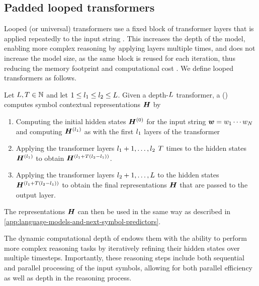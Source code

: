 \subsection{Padded looped transformers} \label{app:looped-padded-transformers}

Looped (or universal) transformers use a fixed block of transformer layers that is applied repeatedly to the input string \citep{dehghani2019universaltransformers}.
This increases the depth of the model, enabling more complex reasoning by applying layers multiple times, and does not increase the model size, as the same block is reused for each iteration, thus reducing the memory footprint and computational cost \citep{bae2025mixtureofrecursionslearningdynamicrecursive}.
We define looped transformers as follows.
\begin{definition} \label{def:looped-transformer}
   Let ${{L}}, {T} \in {{\mathbb{N}}}$ and let $1 \leq {{l}}_1 \leq {{l}}_2 \leq {{L}}$.
   Given a depth-${{L}}$ transformer, a  (\LTAcr) computes symbol contextual representations ${{{{{\bm{H}}}}}}$ by
   \begin{enumerate}[label=(\arabic*.)]
      \item Computing the initial hidden states ${{{{{\bm{H}}}}}}^{(0)}$ for the input string ${{\boldsymbol{w}}} = {{w}}_1\cdots{{w}}_{{N}}$ and computing ${{{{{\bm{H}}}}}}^{({{l}}_1)}$ as with the first ${{l}}_1$ layers of the transformer
      \item Applying the transformer layers ${{l}}_1 + 1, \ldots, {{l}}_2$ ${T}$ times to the hidden states ${{{{{\bm{H}}}}}}^{({{l}}_1)}$ to obtain ${{{{{\bm{H}}}}}}^{({{l}}_1 + {T}({{l}}_2 - {{l}}_1))}$.
      \item Applying the transformer layers ${{l}}_2 + 1, \ldots, {{L}}$ to the hidden states ${{{{{\bm{H}}}}}}^{({{l}}_1 + {T}({{l}}_2 - {{l}}_1))}$ to obtain the final representations ${{{{{\bm{H}}}}}}$ that are passed to the output layer.
   \end{enumerate} 
\end{definition}
The representations ${{{{{\bm{H}}}}}}$ can then be used in the same way as described in \cref{app:language-models-and-next-symbol-predictors}.

The dynamic computational depth of \LTsAcr endows them with the ability to perform more complex reasoning tasks by iteratively refining their hidden states over multiple timesteps.
Importantly, these reasoning steps include both sequential and parallel processing of the input symbols, allowing for both parallel efficiency as well as depth in the reasoning process.


